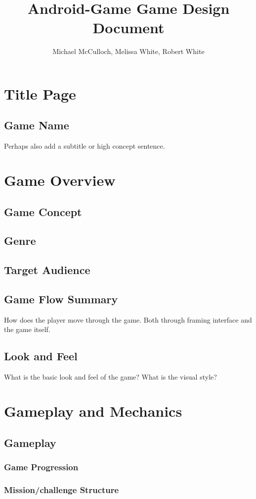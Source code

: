 \documentclass[12pt, letterpaper]{article}
\title{Android-Game Game Design Document}
\author{Michael McCulloch, Melissa White, Robert White}
\begin{document}
\maketitle
\pagebreak
\tableofcontents
\pagebreak

\section{Title Page   }
    \subsection{Game Name}
    Perhaps also add a subtitle or high concept sentence.
\section{Game Overview}
    \subsection{Game Concept}
    \subsection{Genre}
    \subsection{Target Audience}
    \subsection{Game Flow Summary}
    How does the player move through the game.   Both through framing interface and the game itself.
    \subsection{Look and Feel}What is the basic look and feel of the game?  What is the visual style?
\section{Gameplay and  Mechanics}
    \subsection{Gameplay}
        \subsubsection{Game Progression}
        \subsubsection{Mission/challenge Structure}
\end{document}
